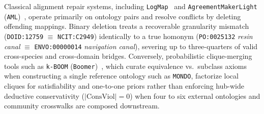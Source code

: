 \documentclass[10pt]{article}
\theoremstyle{accentdef}
\begin{document}
Classical alignment repair systems, including \texttt{LogMap}~\cite{jimenezruiz2011logmap} and \texttt{AgreementMakerLight} (\texttt{AML})~\cite{silva2022aml}, operate primarily on ontology pairs and resolve conflicts by deleting offending mappings. Binary deletion treats a recoverable granularity mismatch (\texttt{DOID:12759} $\equiv$ \texttt{NCIT:C2949}) identically to a true homonym (\texttt{PO:0025132} \emph{resin canal} $\equiv$ \texttt{ENVO:00000014} \emph{navigation canal}), severing up to three-quarters of valid cross-species and cross-domain bridges. Conversely, probabilistic clique-merging tools such as \texttt{k-BOOM} (\texttt{Boomer})~\cite{mungall2019kboom}, which curate equivalence vs.\ subclass axioms when constructing a single reference ontology such as \texttt{MONDO}, factorize local cliques for satisfiability and one-to-one priors rather than enforcing hub-wide deductive conservativity ($|\mathrm{ConsViol}| = 0$) when four to six external ontologies and community crosswalks are composed downstream.
\end{document}
